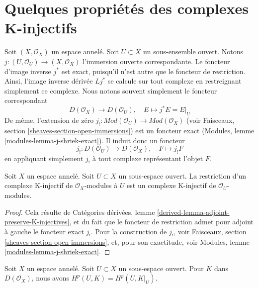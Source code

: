 \section{Quelques propriétés des complexes K-injectifs}

\label{section-properties-K-injective}

\noindent

Soit $(X, \mathcal{O}_X)$ un espace annelé. Soit $U \subset X$ un sous-ensemble ouvert. Notons $j : (U, \mathcal{O}_U) \to (X, \mathcal{O}_X)$
l'immersion ouverte correspondante. Le foncteur d'image inverse $j^*$ est exact, puisqu'il n'est autre que le foncteur de restriction. Ainsi, l'image inverse dérivée $Lj^*$ se calcule sur tout complexe en restreignant simplement ce complexe. Nous notons souvent simplement le foncteur correspondant
$$
D(\mathcal{O}_X) \to D(\mathcal{O}_U),
\quad
E \mapsto j^*E = E|_U
$$
De même, l'extension de zéro
$j_! : \textit{Mod}(\mathcal{O}_U) \to \textit{Mod}(\mathcal{O}_X)$
(voir Faisceaux, section \ref{sheaves-section-open-immersions}) est un foncteur exact (Modules, lemme \ref{modules-lemma-j-shriek-exact}). Il induit donc un foncteur
$$
j_! : D(\mathcal{O}_U) \to D(\mathcal{O}_X),\quad
F \mapsto j_!F
$$
en appliquant simplement $j_!$ à tout complexe représentant l'objet $F$.

\begin{lemma}

\label{lemma-restrict-K-injective-to-open}

Soit $X$ un espace annelé. Soit $U \subset X$ un sous-espace ouvert. La restriction d'un complexe K-injectif de $\mathcal{O}_X$-modules à $U$ est un complexe K-injectif de $\mathcal{O}_U$-modules.

\end{lemma}

\begin{proof}
Cela résulte de Catégories dérivées, lemme \ref{derived-lemma-adjoint-preserve-K-injectives}, et du fait que le foncteur de restriction admet pour adjoint à gauche le foncteur exact $j_!$. Pour la construction de $j_!$, voir Faisceaux, section \ref{sheaves-section-open-immersions}, et, pour son exactitude, voir Modules, lemme \ref{modules-lemma-j-shriek-exact}.
\end{proof}

\begin{lemma}

\label{lemma-unbounded-cohomology-of-open}
Soit $X$ un espace annelé. Soit $U \subset X$ un sous-espace ouvert. Pour $K$ dans $D(\mathcal{O}_X)$, nous avons $H^p(U, K) = H^p(U, K|_U)$.
\end{lemma}

